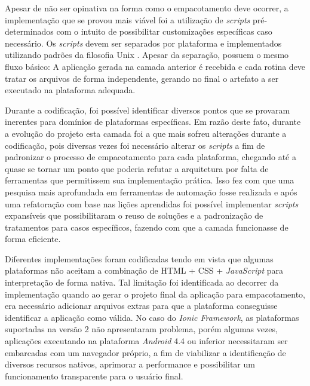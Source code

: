 Apesar de não ser opinativa na forma como o empacotamento deve ocorrer, a implementação que se provou mais viável foi a utilização de \textit{scripts} pré-determinados com o intuito de possibilitar customizações específicas caso necessário. Os \textit{scripts} devem ser separados por plataforma e implementados utilizando padrões da filosofia Unix \cite{unixPhilosophy}. Apesar da separação, possuem o mesmo fluxo básico: A aplicação gerada na camada anterior é recebida e cada rotina deve tratar os arquivos de forma independente, gerando no final o artefato a ser executado na plataforma adequada.

Durante a codificação, foi possível identificar diversos pontos que se provaram inerentes para domínios de plataformas específicas. Em razão deste fato, durante a evolução do projeto esta camada foi a que mais sofreu alterações durante a codificação, pois diversas vezes foi necessário alterar os \textit{scripts} a fim de padronizar o processo de empacotamento para cada plataforma, chegando até a quase se tornar um ponto que poderia refutar a arquitetura por falta de ferramentas que permitissem sua implementação prática. Isso fez com que uma pesquisa mais aprofundada em ferramentas de automação fosse realizada e após uma refatoração com base nas lições aprendidas foi possível implementar \textit{scripts} expansíveis que possibilitaram o reuso de soluções e a padronização de tratamentos para casos específicos, fazendo com que a camada funcionasse de forma eficiente.

Diferentes implementações foram codificadas tendo em vista que algumas plataformas não aceitam a combinação de HTML + CSS + \textit{JavaScript} para interpretação de forma nativa. Tal limitação foi identificada ao decorrer da implementação quando ao gerar o projeto final da aplicação para empacotamento, era necessário adicionar arquivos extras para que a plataforma conseguisse identificar a aplicação como válida. No caso do \textit{Ionic Framework}, as plataformas suportadas na versão 2 não apresentaram problema, porém algumas vezes, aplicações executando na plataforma \textit{Android} 4.4 ou inferior necessitaram ser embarcadas com um navegador próprio, a fim de viabilizar a identificação de diversos recursos nativos, aprimorar a performance e possibilitar um funcionamento transparente para o usuário final.

